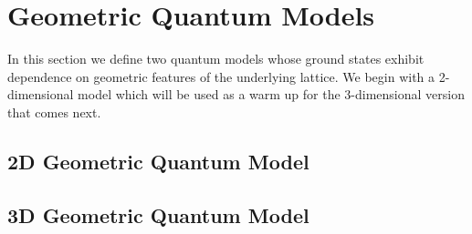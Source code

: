 \documentclass[%
nofootinbib,
 amsmath,amssymb,
aps,
]{revtex4-1}
\theoremstyle{plain}%
\theoremstyle{definition}
\theoremstyle{remark}
\begin{document}
\section{Geometric Quantum Models }\label{sec:QModels}

In this section we define two quantum models whose ground states exhibit dependence on geometric features of the underlying lattice. We begin with a 2-dimensional model which will be used as a warm up for the 3-dimensional version that comes next.

\subsection{2D Geometric Quantum Model }\label{sec:2Dmodel}

\subsection{3D Geometric Quantum Model }\label{sec:3Dmodel}
\end{document}
